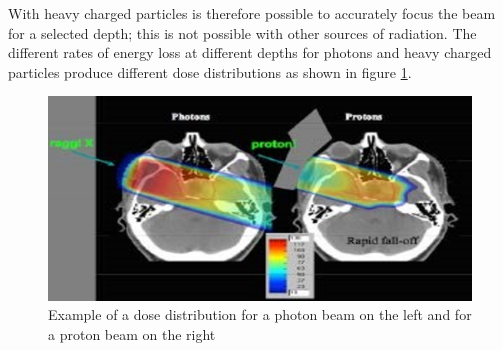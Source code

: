 \noindent With heavy charged particles is therefore possible to accurately focus the beam for a selected depth; this is not possible with other sources of radiation.
\newline
The different rates of energy loss at different depths for photons and heavy charged particles produce different dose distributions as shown in figure \ref{fig:Dose}.
\begin{figure}[H]
	\centering
	\includegraphics[width=0.7\linewidth]{IMG/ch1/Dose}
	\caption{Example of a dose distribution for a photon beam on the left and for a proton beam on the right}
	\label{fig:Dose}
\end{figure}

